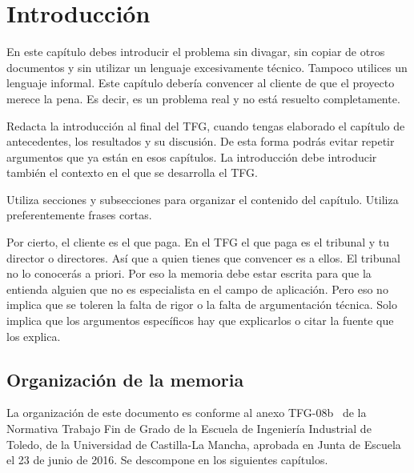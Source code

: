 \chapter{Introducción} 
\label{ch:introduccion}

En este capítulo debes introducir el problema sin divagar, sin copiar de otros documentos y sin utilizar un lenguaje excesivamente técnico.  Tampoco utilices un lenguaje informal.  Este capítulo debería convencer al cliente de que el proyecto merece la pena.  Es decir, es un problema real y no está resuelto completamente.

Redacta la introducción al final del TFG, cuando tengas elaborado el capítulo de antecedentes, los resultados y su discusión.  De esta forma podrás evitar repetir argumentos que ya están en esos capítulos.  La introducción debe introducir también el contexto en el que se desarrolla el TFG.

Utiliza secciones y subsecciones para organizar el contenido del capítulo.  Utiliza preferentemente frases cortas.

Por cierto, el cliente es el que paga.  En el TFG el que paga es el tribunal y tu director o directores.  Así que a quien tienes que convencer es a ellos.  El tribunal no lo conocerás a priori.  Por eso la memoria debe estar escrita para que la entienda alguien que no es especialista en el campo de aplicación.  Pero eso no implica que se toleren la falta de rigor o la falta de argumentación técnica.  Solo implica que los argumentos específicos hay que explicarlos o citar la fuente que los explica.


\section{Organización de la memoria} 
\label{sec:organizacion-memoria}

La organización de este documento es conforme al anexo TFG-08b~\cite{tfg08b} de la Normativa Trabajo Fin de Grado de la Escuela de Ingeniería Industrial de Toledo, de la Universidad de Castilla-La Mancha, aprobada en Junta de Escuela el 23 de junio de 2016. Se descompone en los siguientes capítulos.

